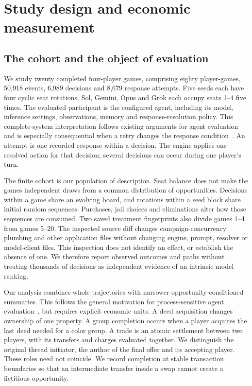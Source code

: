 
\section{Study design and economic measurement}
\label{sec:sol-economic-methods}

\subsection{The cohort and the object of evaluation}

We study twenty completed four-player games, comprising eighty player-games, 50,918 events, 6,989 decisions and 8,679 response attempts. Five seeds each have four cyclic seat rotations. Sol, Gemini, Opus and Grok each occupy seats 1--4 five times. The evaluated participant is the configured agent, including its model, inference settings, observations, memory and response-resolution policy. This complete-system interpretation follows existing arguments for agent evaluation and is especially consequential when a retry changes the response condition~\cite{kapoor2026hal,zhang2026dece}. An attempt is one recorded response within a decision. The engine applies one resolved action for that decision; several decisions can occur during one player's turn.

The finite cohort is our population of description. Seat balance does not make the games independent draws from a common distribution of opportunities. Decisions within a game share an evolving board, and rotations within a seed block share initial random sequences. Purchases, jail choices and eliminations alter how those sequences are consumed. Two saved treatment fingerprints also divide games 1--4 from games 5--20. The inspected source diff changes campaign-concurrency plumbing and other application files without changing engine, prompt, resolver or model-client files. This inspection does not identify an effect, or establish the absence of one. We therefore report observed outcomes and paths without treating thousands of decisions as independent evidence of an intrinsic model ranking.

Our analysis combines whole trajectories with narrower opportunity-conditioned summaries. This follows the general motivation for process-sensitive agent evaluation~\cite{ma2024agentboard}, but requires explicit economic units. A deed acquisition changes ownership of one property. A group completion occurs when a player acquires the last deed needed for a color group. A trade is an atomic settlement between two players, with its transfers and charges evaluated together. We distinguish the original thread initiator, the author of the final offer and its accepting player. These roles need not coincide. We record completion at stable transaction boundaries so that an intermediate transfer inside a swap cannot create a fictitious opportunity.


